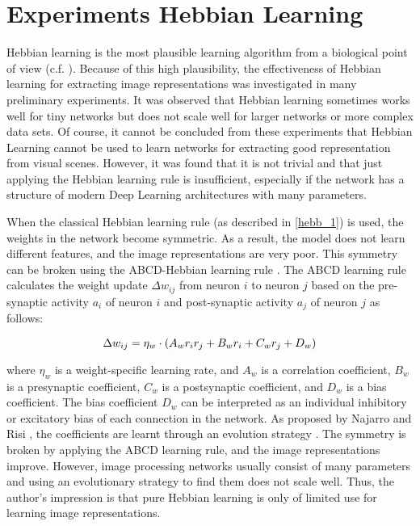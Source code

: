 \pagebreak
\chapter{Experiments Hebbian Learning}
Hebbian learning is the most plausible learning algorithm from a biological point of view (c.f. ).
Because of this high plausibility, the effectiveness of Hebbian learning for extracting image representations was investigated in many preliminary experiments.
It was observed that Hebbian learning sometimes works well for tiny networks but does not scale well for larger networks or more complex data sets.
Of course, it cannot be concluded from these experiments that Hebbian Learning cannot be used to learn networks for extracting good representation from visual scenes.
However, it was found that it is not trivial and that just applying the Hebbian learning rule is insufficient, especially if the network has a structure of modern Deep Learning architectures with many parameters.

When the classical Hebbian learning rule (as described in \eqref{hebb_1}) is used, the weights in the network become symmetric.
As a result, the model does not learn different features, and the image representations are very poor.
This symmetry can be broken using the ABCD-Hebbian learning rule .
The ABCD learning rule calculates the weight update \(\Delta w_{ij}\) from neuron \(i\) to neuron \(j\) based on the pre-synaptic activity \(a_i\) of neuron \(i\) and post-synaptic activity \(a_j\) of neuron \(j\) as follows:

\begin{equation}\eqlbl{hebb_abcd}
	\Delta w_{ij} = \eta_w \cdot (A_wr_ir_j+B_wr_i+C_wr_j+D_w)
\end{equation}

where \(\eta_w\) is a weight-specific learning rate, and \(A_w\) is a correlation coefficient, \(B_w\) is a presynaptic coefficient, \(C_w\) is a postsynaptic coefficient, and \(D_w\) is a bias coefficient.
The bias coefficient \(D_w\) can be interpreted as an individual inhibitory or excitatory bias of each connection in the network.
As proposed by Najarro and Risi , the coefficients are learnt through an evolution strategy .
The symmetry is broken by applying the ABCD learning rule, and the image representations improve.
However, image processing networks usually consist of many parameters and using an evolutionary strategy to find them does not scale well.
Thus, the author's impression is that pure Hebbian learning is only of limited use for learning image representations.


